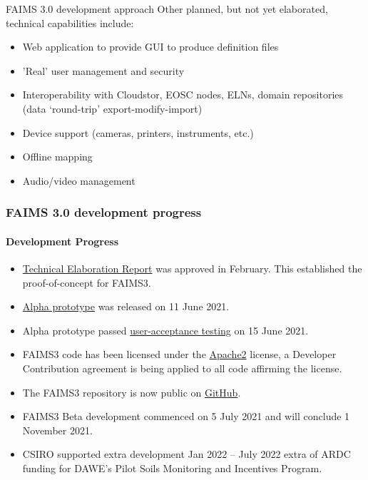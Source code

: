 \begin{frame}{FAIMS 3.0 development approach}
Other planned, but not yet elaborated, technical capabilities include:
    \begin{itemize}
        \item Web application to provide GUI to produce definition files
        \item 'Real' user management and security
        \item Interoperability with Cloudstor, EOSC nodes, ELNs, domain repositories (data `round-trip' export-modify-import)
        \item Device support (cameras, printers, instruments, etc.)
        \item Offline mapping
        \item Audio/video management
    \end{itemize}
\end{frame}


\begin{frame}
    \frametitle{FAIMS 3.0 development progress}
    \framesubtitle{Development Progress}        
        \begin{itemize}
            \item \href{https://docs.google.com/document/d/13eTN8jhJa3Pgs9GOdo7r4jtIQcskNo7ikxJcBDBKHzw/edit}{Technical Elaboration Report} was approved in February. This established the proof-of-concept for FAIMS3. 
          \item \href{https://github.com/FAIMS/FAIMS3/releases/tag/v0.1.0-alpha}{Alpha prototype} was released on 11 June 2021.  
          \item Alpha prototype passed \href{https://doi.org/10.5281/zenodo.5030772}{user-acceptance testing} on 15 June 2021.
        \item FAIMS3 code has been licensed under the \href{https://www.apache.org/licenses/LICENSE-2.0}{Apache2} license, a Developer Contribution agreement is being applied to all code affirming the license. 
        \item The FAIMS3 repository is now public on \href{https://github.com/FAIMS/FAIMS3}{GitHub}.
        \item FAIMS3 Beta development commenced on 5 July 2021 and will conclude 1 November 2021. 
        \item CSIRO supported extra development Jan 2022 -- July 2022 extra of ARDC funding for DAWE's Pilot Soils Monitoring and Incentives Program.

    \end{itemize}



\end{frame} 